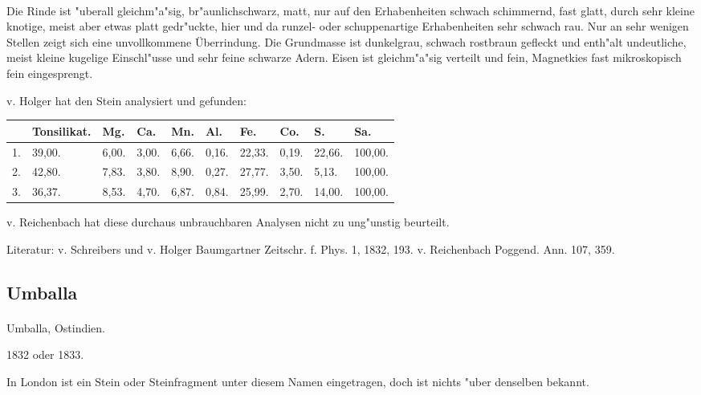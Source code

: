 \documentclass[a4paper, 11pt, oneside]{article}
\begin{document}
\paragraph{}
Die Rinde ist "uberall gleichm"a"sig, br"aunlichschwarz, matt, nur auf den Erhabenheiten schwach schimmernd, fast glatt, durch sehr kleine knotige, meist aber etwas platt gedr"uckte, hier und da runzel- oder schuppenartige Erhabenheiten sehr schwach rau. Nur an sehr wenigen Stellen zeigt sich eine unvollkommene Überrindung. Die Grundmasse ist dunkelgrau, schwach rostbraun gefleckt und enth"alt undeutliche, meist kleine kugelige Einschl"usse und sehr feine schwarze Adern. Eisen ist gleichm"a"sig verteilt und fein, Magnetkies fast mikroskopisch fein eingesprengt.

v. Holger hat den Stein analysiert und gefunden:
\begin{table}[!ht]
    \centering
    \footnotesize
    \begin{tabular}{l l l l l l l l l l}
         & Tonsilikat. & Mg. & Ca. & Mn. & Al. & Fe. & Co. & S. & Sa. \\ \hline
        1. & 39,00. & 6,00. & 3,00. & 6,66. & 0,16. & 22,33. & 0,19. & 22,66. & 100,00. \\
        2. & 42,80. & 7,83. & 3,80. & 8,90. & 0,27. & 27,77. & 3,50. & 5,13. & 100,00. \\
        3. & 36,37. & 8,53. & 4,70. & 6,87. & 0,84. & 25,99. & 2,70. & 14,00. & 100,00. \\
    \end{tabular}
\end{table}

v. Reichenbach hat diese durchaus unbrauchbaren Analysen nicht zu ung"unstig beurteilt.

\footnotesize
Literatur: v. Schreibers und v. Holger Baumgartner Zeitschr. f. Phys. 1, 1832, 193. v. Reichenbach Poggend. Ann. 107, 359.

\subsection{Umballa}
\normalsize
\paragraph{}
Umballa, Ostindien.

1832 oder 1833.

In London ist ein Stein oder Steinfragment unter diesem Namen eingetragen, doch ist nichts "uber denselben bekannt.
\end{document}
